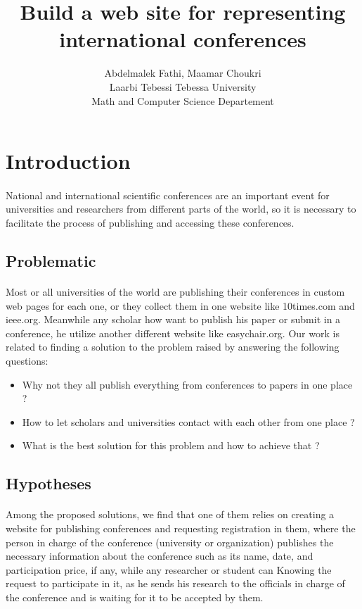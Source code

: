 \documentclass[12pt,a4paper]{article}
\author{Abdelmalek Fathi, Maamar Choukri\\
Laarbi Tebessi Tebessa University\\
Math and Computer Science Departement}
\title{Build a web site for representing international conferences}
\date{}
\begin{document}
	\maketitle
	\clearpage
	\listoffigures
	\listoftables
	\clearpage
	\tableofcontents
	\clearpage
	\section{Introduction}
	\paragraph{}
	National and international scientific conferences are an important event for universities and researchers from different parts of the world, so it is necessary to facilitate the process of publishing and accessing these conferences.
	\subsection{Problematic}
	\paragraph{}
	Most or all universities of the world are publishing their conferences in custom web pages for each one, or they collect them in one website like 10times.com and ieee.org. Meanwhile any scholar how want to publish his paper or submit in a conference, he utilize another different website like easychair.org. Our work is related to finding a solution to the problem raised by answering the following questions:
	\begin{itemize}
		\item Why not they all publish everything from conferences to papers in one place ?
		\item How to let scholars and universities contact with each other from one place ?
		\item What is the best solution for this problem and how to achieve that ?
	\end{itemize}
	\subsection{Hypotheses}
	\paragraph{}
	Among the proposed solutions, we find that one of them relies on creating a website for publishing conferences and requesting registration in them, where the person in charge of the conference (university or organization) publishes the necessary information about the conference such as its name, date, and participation price, if any, while any researcher or student can Knowing the request to participate in it, as he sends his research to the officials in charge of the conference and is waiting for it to be accepted by them.
\end{document}
